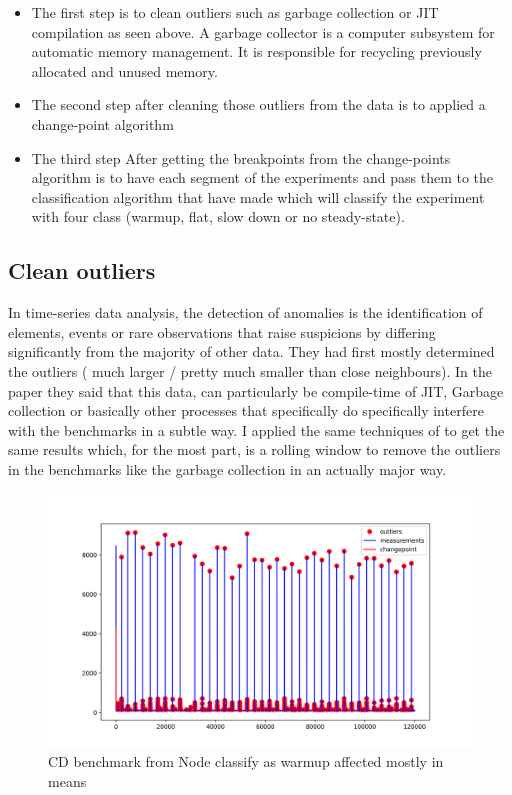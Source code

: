 \documentclass{article}
\begin{document}
\begin{itemize}
    \item The first step is to clean outliers such as garbage collection or JIT compilation as seen above. A garbage collector is a computer subsystem for automatic memory management.  It is responsible for recycling previously allocated and unused memory.  
    \item The second step after cleaning those outliers from the data is to applied a change-point algorithm \citep{killick2014changepoint}
    \item The third step After getting the breakpoints from the change-points algorithm is to have each segment of the experiments and pass them to the classification algorithm that \citep{barrett2017virtual} have made which will classify the experiment with four class (warmup, flat, slow down or no steady-state).
\end{itemize}




\subsection{Clean outliers}

In time-series data analysis, the detection of anomalies is the identification of elements, events or rare observations that raise suspicions by differing significantly from the majority of other data. They had first mostly determined the outliers ( much larger / pretty much smaller than close neighbours). In the paper \citep{barrett2017virtual} they said that this data, can particularly be compile-time of JIT, Garbage collection or basically other processes that specifically do specifically interfere with the benchmarks in a subtle way. I applied the same techniques of \citep{barrett2017virtual} to get the same results which, for the most part, is a rolling window to remove the outliers in the benchmarks like the garbage collection in an actually major way.

\begin{figure}[h!]
    \centering
    \includegraphics[width=1\textwidth]{images/plot_13_flat.png}
    \caption{CD benchmark from Node classify as warmup affected mostly in means}
    \label{fig:bench_node_flat}
\end{figure}
\end{document}
